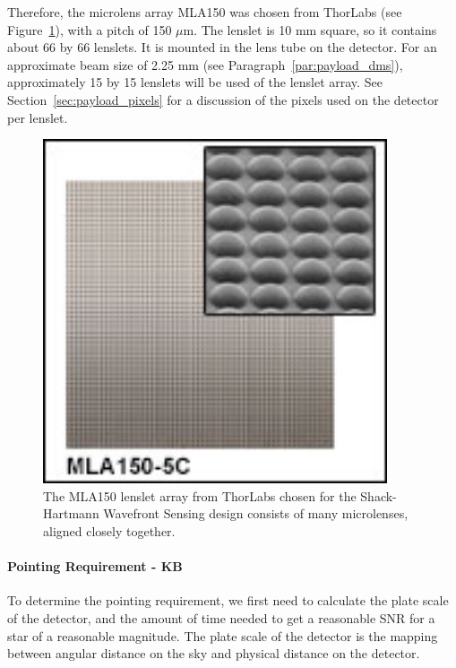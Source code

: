 \documentclass[12pt]{article}
\begin{document}
Therefore, the microlens array MLA150 was chosen from ThorLabs \cite{MLA150} (see Figure~\ref{fig:MLA150}), with a pitch of 150 $\mu$m.
The lenslet is 10 mm square, so it contains about 66 by 66 lenslets. It is mounted in the lens tube on the detector. For an approximate beam size of 2.25 mm (see Paragraph~\ref{par:payload_dms}), approximately 15 by 15 lenslets will be used of the lenslet array.  See Section~\ref{sec:payload_pixels} for a discussion of the pixels used on the detector per lenslet.

\begin{figure}[ht]
\centering
  \includegraphics[width=4in]{images/payload_MLA150.jpg}
\caption{The MLA150 lenslet array from ThorLabs \cite{MLA150} chosen for the Shack-Hartmann Wavefront Sensing design consists of many microlenses, aligned closely together.}
\label{fig:MLA150}
\end{figure}

\paragraph{Pointing Requirement - KB}\label{sec:pointing_requirement}

To determine the pointing requirement, we first need to calculate the plate scale of the detector, and the amount of time needed to get a reasonable SNR for a star of a reasonable magnitude. The plate scale of the detector is the mapping between angular distance on the sky and physical distance on the detector. 

			
\end{document}
